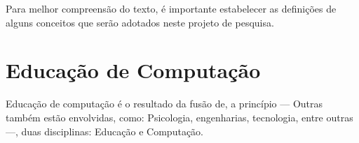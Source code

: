 Para melhor compreensão do texto, é importante estabelecer as definições de alguns conceitos que serão adotados neste projeto de pesquisa. 

\section{Educação de Computação}
\label{sec:EC}

Educação de computação é o resultado da fusão de, a princípio --- Outras também estão envolvidas, como: Psicologia, engenharias, tecnologia, entre outras ---, duas disciplinas: Educação e Computação. 

